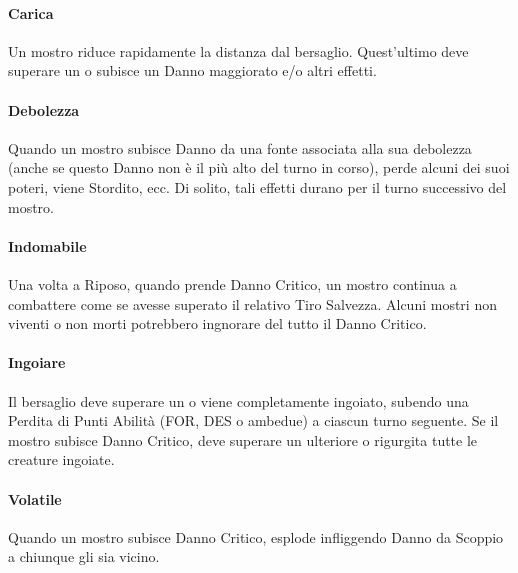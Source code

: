 \documentclass[itdr]{subfiles}
\begin{document}
\vfill
\paragraph{Carica}
Un mostro riduce rapidamente la distanza dal bersaglio. Quest'ultimo deve superare un  o subisce un Danno maggiorato e/o altri effetti.

\vfill
\paragraph{Debolezza}
Quando un mostro subisce Danno da una fonte associata alla sua debolezza (anche se questo Danno non è il più alto del turno in corso), perde alcuni dei suoi poteri, viene Stordito, ecc. Di solito, tali effetti durano per il turno successivo del mostro.

\vfill
\paragraph{Indomabile}
Una volta a Riposo, quando prende Danno Critico, un mostro continua a combattere come se avesse superato il relativo Tiro Salvezza. Alcuni mostri non viventi o non morti potrebbero ingnorare del tutto il Danno Critico.

\vfill
\paragraph{Ingoiare}
Il bersaglio deve superare un  o viene completamente ingoiato, subendo una Perdita di Punti Abilità (FOR, DES o ambedue) a ciascun turno seguente. Se il mostro subisce Danno Critico, deve superare un ulteriore  o rigurgita tutte le creature ingoiate.

\vfill
\paragraph{Volatile}
Quando un mostro subisce Danno Critico, esplode infliggendo Danno da Scoppio a chiunque gli sia vicino.

\vfill
\end{document}
